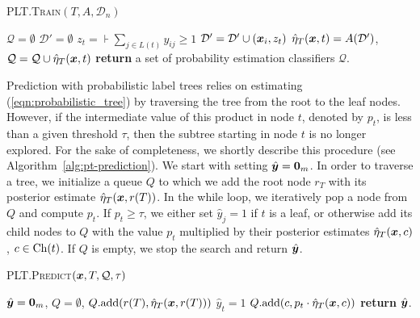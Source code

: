 \documentclass{article}
\newcommand{\cD}{\mathcal{D}}
\newcommand{\Algo}[1]{\textsc{#1}}
\begin{document}
%
\begin{algorithm}[t]
\caption{\Algo{PLT.Train}$(T, A, \cD_n)$}%
\label{alg:pt-learning}
\begin{algorithmic}[1]
\State $\mathcal{Q} = \emptyset$
\State $\cD' = \emptyset$
\State $z_t = \assert{\sum_{j \in L(t)} y_{ij} \ge 1 }$
\State $\cD' = \cD' \cup (\bx_i, z_t)$ 
\EndIf
\EndFor
\State $\heta_T(\bx,t) = A(\cD')$, $\mathcal{Q} = \mathcal{Q} \cup \hat{\eta}_T(\boldsymbol{x},t) $  
\EndFor
\State \textbf{return} a set of probability estimation classifiers $\mathcal{Q}$. 
\end{algorithmic}
\end{algorithm} 

Prediction with probabilistic label trees relies on estimating (\ref{eqn:probabilistic_tree}) by traversing the tree from the root to the leaf nodes. However, if the intermediate value of this product in node $t$, denoted by $p_t$, is less than a given threshold $\tau$, then the subtree starting in node $t$ is no longer explored. For the sake of completeness, we shortly describe this procedure (see Algorithm~\ref{alg:pt-prediction}). We start with setting $\hat{\boldsymbol{y}} = \boldsymbol{0}_m$. In order to traverse a tree, we initialize a queue $Q$ to which we add the root node $r_T$ with its posterior estimate $\hat{\eta}_T(\boldsymbol{x},r(T))$. In the while loop, we iteratively pop a node from $Q$ and compute $p_t$. If $p_t \ge \tau$, we either set $\hat{y}_j = 1$ if $t$ is a leaf, or otherwise add its child nodes to $Q$ with the value $p_t$ multiplied by their posterior estimates $\hat{\eta}_T(\boldsymbol{x}, c)$, $c \in \mathrm{Ch}(t)$. If $Q$ is empty, we stop the search and return $\hat{\boldsymbol{y}}$.

\begin{algorithm}[t]
\caption{\Algo{PLT.Predict}$(\boldsymbol{x}, T, \mathcal{Q}, \tau)$}%
\label{alg:pt-prediction}
\begin{algorithmic}[1]
\State $\hat{\boldsymbol{y}} = \boldsymbol{0}_m$, $Q = \emptyset$, $Q.\mathrm{add}(r(T),\hat{\eta}_T(\boldsymbol{x},r(T)))$ 
\State $\hat{y}_t = 1$ 
\Else
{} 
\State $Q.\mathrm{add}(c, p_t \cdot \hat{\eta}_T(\boldsymbol{x},c))$ 
\EndFor
\EndIf
\EndIf
\EndWhile
\State \textbf{return} $\hat{\boldsymbol{y}}$. 
\end{algorithmic}
\end{algorithm} 
\end{document}
